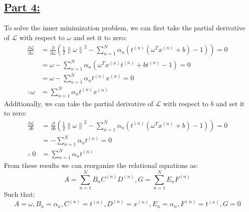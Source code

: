 \documentclass[20pt]{article}
\begin{document}
\subsection*{\underline{Part 4:}}
To solve the inner minimization problem, we can first take the partial derivative of $\mathcal{L}$ with respect to $\omega$ and set it to zero:
\begin{align}
    \frac{\partial \mathcal{L}}{\partial \omega} & = \frac{\partial}{\partial \omega} (\frac{1}{2}\left\lVert \omega \right\rVert^2 - \sum_{n=1}^{N} \alpha_n \left( t^{(n)}(\omega^Tx^{(n)}+b) - 1 \right)) = 0
    \\ & = \omega - \sum_{n=1}^{N} \alpha_n (\omega^T x^{(n)} t^{(n)} + b t^{(n)} -1) = 0
    \\ & = \omega - \sum_{n=1}^{N} \alpha_n t^{(n)}x^{(n)} = 0
    \\ \therefore \omega & = \sum_{n=1}^{N} \alpha_n t^{(n)}x^{(n)}
\end{align}
Additionally, we can take the partial derivative of $\mathcal{L}$ with respect to $b$ and set it to zero:
\begin{align}
    \frac{\partial \mathcal{L}}{\partial b} & = \frac{\partial}{\partial b} (\frac{1}{2}\left\lVert \omega \right\rVert^2 - \sum_{n=1}^{N} \alpha_n \left( t^{(n)}(\omega^Tx^{(n)}+b) - 1 \right)) = 0
    \\ & = - \sum_{n=1}^{N} \alpha_n t^{(n)} = 0
    \\ \therefore \ 0 & = \sum_{n=1}^{N} \alpha_n t^{(n)}
\end{align}
From these results we can reorganize the relational equations as:
\begin{equation}
    A = \sum_{n=1}^{N} B_n C^{(n)}D^{(n)}
    , G = \sum_{n=1}^{N} E_n F^{(n)}
\end{equation}
Such that:
\begin{equation}
    A = \omega
    , B_n = \alpha_n
    , C^{(n)} = t^{(n)}
    , D^{(n)} = x^{(n)}
    , E_n = \alpha_n
    , F^{(n)} = t^{(n)}
    , G = 0
\end{equation}
\end{document}
